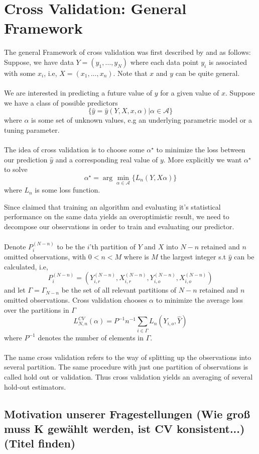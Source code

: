 \documentclass[Research_Module_ES.tex]{subfiles}
\begin{document}
\section{Cross Validation: General Framework}
The general Framework of cross validation was first described by \cite{stone1974cross} and  \cite{geisser1975predictive} as follows: \\

Suppose, we have data $Y=(y_1,\ldots,y_N)$ where each data point $y_i$ is associated with some $x_i$, i.e, $X=(x_1,\ldots,x_n)$. Note that $x$ and $y$ can be quite general.\\
\\
We are interested in predicting a future value of $y$ for a given value of $x$. Suppose we have a class of possible predictors 
\[
	\{\hat{y}=\hat{y}(Y,X,x,\alpha)|\alpha\in\mathscr{A}\}
\]
where $\alpha$ is some set of unknown values, e.g an underlying parametric model or a tuning parameter.\\
\\
The idea of cross validation is to choose some $\alpha^\star$ to minimize the loss between our prediction $\hat{y}$ and a corresponding real value of $y$. More explicitly we want $\alpha^\star$ to solve
\[
	\alpha^\star=\arg\min_{\alpha\in\mathscr{A}}\{L_n(Y,X\alpha)\}
\]
where $L_n$ is some loss function.
 
Since \cite{larson1931shrinkage} claimed that training an algorithm and evaluating it's statistical performance on the same data yields an overoptimistic result, we need to decompose our observations in order to train and evaluating our predictor. \\
\\
Denote $P^{(N-n)}_i$ to be the $i$'th partition of $Y$ and $X$ into $N-n$ retained and $n$ omitted observations, with $0<n<M$ where is $M$ the largest integer s.t $\hat{y}$ can be calculated, i.e,
\[
	P^{(N-n)}_i=(Y_{i,r}^{(N-n)},X_{i,r}^{(N-n)},Y_{i,o}^{(N-n)},X_{i,o}^{(N-n)})
\]
and let $\Gamma=\Gamma_{N-n}$ be the set of all relevant partitions of $N-n$ retained and $n$ omitted observations. Cross validation chooses $\alpha$ to minimize the average loss over the partitions in $\Gamma$ 
\[
	L_{N,n}^{CV}(\alpha)=P^{-1}n^{-1}\sum_{i\in\Gamma}L_n(Y_{i,o},\hat{Y})
\]
where $P^{-1}$ denotes the number of elements in $\Gamma$.\\
\\
The name cross validation refers to the way of splitting up the observations into several partition. The same procedure with just one partition of observations is called hold out or validation. Thus cross validation yields an averaging of several hold-out estimators.







\subsection{Motivation unserer Fragestellungen (Wie groß muss K gewählt werden, ist CV konsistent...)(Titel finden)}
\end{document}
